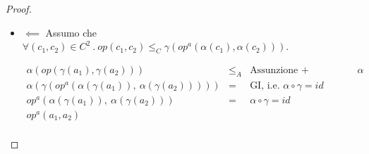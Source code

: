 {\begin{proof}
\begin{itemize}
\item $\boxed{\impliedby}$
Assumo che $\forall (c_1, c_2) \in C^2\ .\ op(c_1, c_2) \leq_C \gamma(op^a(\alpha(c_1), \alpha(c_2)))$.

$$
\begin{array}{llr}
\alpha(op(\gamma(a_1), \gamma(a_2))) & \leq_A & \text{Assunzione + monotonia di $\alpha$}\\
\alpha(\gamma(op^a(\alpha(\gamma(a_1)),\ \alpha(\gamma(a_2))))) & = & \text{GI, i.e. $\alpha \circ \gamma = id$}\\
op^a(\alpha(\gamma(a_1)),\ \alpha(\gamma(a_2))) & = & \alpha \circ \gamma = id\\
op^a(a_1, a_2) & & \\
\end{array}
$$

\end{itemize}
\end{proof}


}